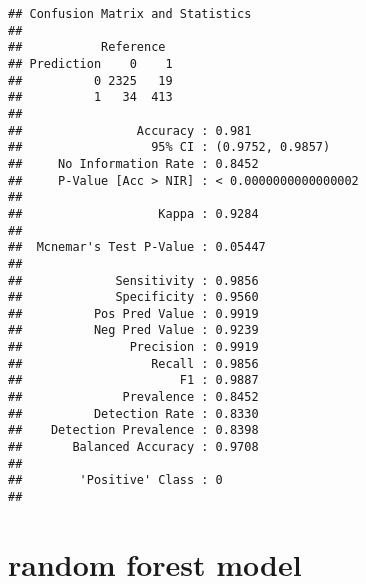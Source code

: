 \documentclass[
]{article}
\begin{document}
\begin{verbatim}
## Confusion Matrix and Statistics
## 
##           Reference
## Prediction    0    1
##          0 2325   19
##          1   34  413
##                                               
##                Accuracy : 0.981               
##                  95% CI : (0.9752, 0.9857)    
##     No Information Rate : 0.8452              
##     P-Value [Acc > NIR] : < 0.0000000000000002
##                                               
##                   Kappa : 0.9284              
##                                               
##  Mcnemar's Test P-Value : 0.05447             
##                                               
##             Sensitivity : 0.9856              
##             Specificity : 0.9560              
##          Pos Pred Value : 0.9919              
##          Neg Pred Value : 0.9239              
##               Precision : 0.9919              
##                  Recall : 0.9856              
##                      F1 : 0.9887              
##              Prevalence : 0.8452              
##          Detection Rate : 0.8330              
##    Detection Prevalence : 0.8398              
##       Balanced Accuracy : 0.9708              
##                                               
##        'Positive' Class : 0                   
## 
\end{verbatim}

\section{random forest model}\label{random-forest-model}
\end{document}
